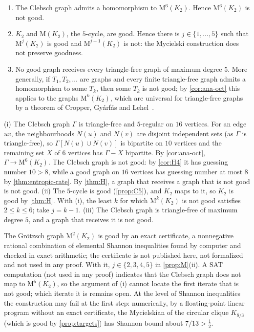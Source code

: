 \begin{proposition}\label{prop:M}
\notformalized
\begin{enumerate}[label=(\roman*)]
\item The Clebsch graph admits a homomorphism to $\mathrm M^6(K_2)$. Hence $\mathrm M^6(K_2)$ is not good.
\item $K_2$ and $\mathrm M(K_2)$, the $5$-cycle, are good. Hence there is $j\in\{1,\dots,5\}$ such that $\mathrm M^j(K_2)$
  is good and $\mathrm M^{j+1}(K_2)$ is not: the Mycielski construction does not preserve goodness.
\item No good graph receives every triangle-free graph of maximum degree $5$. More generally, if $T_1,T_2,\dots$ are
  graphs and every finite triangle-free graph admits a homomorphism to some $T_k$, then some $T_k$ is not good; by
  \cref{cor:ana-oct} this applies to the graphs $\mathrm M^k(K_2)$, which are universal for triangle-free graphs by
  a theorem of Cropper, Gyárfás and Lehel~\cite{CGL2006}.
\end{enumerate}
\end{proposition}

\begin{informalproof}
(i) The Clebsch graph $\Gamma$ is triangle-free and $5$-regular on $16$ vertices. For an edge $uv$, the neighbourhoods
$N(u)$ and $N(v)$ are disjoint independent sets (as $\Gamma$ is triangle-free), so $\Gamma[N(u)\cup N(v)]$ is bipartite
on $10$ vertices and the remaining set $X$ of $6$ vertices has $\Gamma-X$ bipartite. By \cref{cor:ana-oct},
$\Gamma\to\mathrm M^6(K_2)$. The Clebsch graph is not good: by \cref{cor:H4} it has guessing number $10>8$, while a good
graph on $16$ vertices has guessing number at most $8$ by \cref{thm:entropic-rate}. By \cref{thm:H}, a graph that
receives a graph that is not good is not good. (ii) The $5$-cycle is good (\cref{prop:C5}), and $K_2$ maps to it, so
$K_2$ is good by \cref{thm:H}. With (i), the least $k$ for which $\mathrm M^k(K_2)$ is not good satisfies $2\le k\le6$;
take $j=k-1$. (iii) The Clebsch graph is triangle-free of maximum degree $5$, and a graph that receives it is not good.
\end{informalproof}

\begin{remark}\label{rem:ana-myc}
The Gr\"otzsch graph $\mathrm M^2(K_2)$ is good by an exact certificate, a nonnegative rational combination of
elemental Shannon inequalities found by computer and checked in exact arithmetic; the certificate is not published here,
not formalized and not used in any proof. With it,
$j\in\{2,3,4,5\}$ in \cref{prop:M}(ii). A SAT computation (not used in any proof) indicates that the Clebsch graph does
not map to $\mathrm M^5(K_2)$, so the argument of (i) cannot locate the first iterate that is not good; which iterate it
is remains open. At the level of Shannon inequalities the construction may fail at the first step: numerically, by a
floating-point linear program without an exact certificate, the Mycielskian of the circular clique $K_{8/3}$ (which is
good by \cref{prop:targets}) has Shannon bound about $7/13>\frac12$.
\end{remark}

